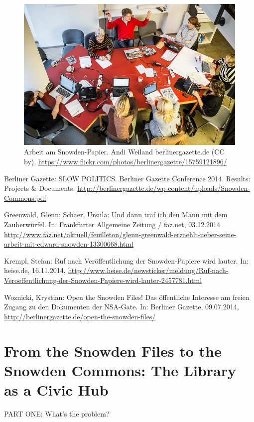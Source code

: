 \documentclass[a4paper,
fontsize=11pt,
oneside,
numbers=noperiodatend,
parskip=half-,
bibliography=totoc,
final
]{scrartcl}
\begin{document}
\begin{figure}[htbp]
\centering
\includegraphics{flickr.jpg}
\caption{Arbeit am Snowden-Papier. Andi Weiland \textbar{}
berlinergazette.de (CC by),
\url{https://www.flickr.com/photos/berlinergazette/15759121896/}}
\end{figure}

Berliner Gazette: SLOW POLITICS. Berliner Gazette Conference 2014.
Results: Projects \& Documents.
\url{http://berlinergazette.de/wp-content/uploads/Snowden-Commons.pdf}

Greenwald, Glenn; Schaer, Ursula: Und dann traf ich den Mann mit dem
Zauberwürfel. In: Frankfurter Allgemeine Zeitung / faz.net, 03.12.2014
\url{http://www.faz.net/aktuell/feuilleton/glenn-greenwald-erzaehlt-ueber-seine-arbeit-mit-edward-snowden-13300668.html}

Krempl, Stefan: Ruf nach Veröffentlichung der Snowden-Papiere wird
lauter. In: heise.de, 16.11.2014,
\url{http://www.heise.de/newsticker/meldung/Ruf-nach-Veroeffentlichung-der-Snowden-Papiere-wird-lauter-2457781.html}

Woznicki, Krystian: Open the Snowden Files! Das öffentliche Interesse am
freien Zugang zu den Dokumenten der NSA-Gate. In: Berliner Gazette,
09.07.2014, \url{http://berlinergazette.de/open-the-snowden-files/}

\section*{From the Snowden Files to the Snowden Commons: The
Library as a Civic Hub}\label{from-the-snowden-files-to-the-snowden-commons-the-library-as-a-civic}

PART ONE: What's the problem?
\end{document}
